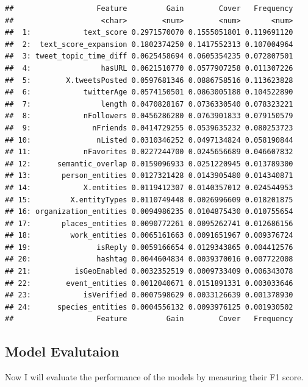 \documentclass[
]{article}
\begin{document}
\begin{verbatim}
##                   Feature         Gain        Cover   Frequency
##                    <char>        <num>        <num>       <num>
##  1:            text_score 0.2971570070 0.1555051801 0.119691120
##  2:  text_score_expansion 0.1802374250 0.1417552313 0.107004964
##  3: tweet_topic_time_diff 0.0625458694 0.0605354235 0.072807501
##  4:                hasURL 0.0621510770 0.0577907258 0.011307226
##  5:        X.tweetsPosted 0.0597681346 0.0886758516 0.113623828
##  6:            twitterAge 0.0574150501 0.0863005188 0.104522890
##  7:                length 0.0470828167 0.0736330540 0.078323221
##  8:            nFollowers 0.0456286280 0.0763901833 0.079150579
##  9:              nFriends 0.0414729255 0.0539635232 0.080253723
## 10:               nListed 0.0310346252 0.0497134824 0.058190844
## 11:            nFavorites 0.0227244700 0.0245656689 0.046607832
## 12:      semantic_overlap 0.0159096933 0.0251220945 0.013789300
## 13:       person_entities 0.0127321428 0.0143905480 0.014340871
## 14:            X.entities 0.0119412307 0.0140357012 0.024544953
## 15:         X.entityTypes 0.0110749448 0.0026996609 0.018201875
## 16: organization_entities 0.0094986235 0.0104875430 0.010755654
## 17:       places_entities 0.0090772261 0.0095262741 0.012686156
## 18:         work_entities 0.0065161663 0.0091651967 0.009376724
## 19:               isReply 0.0059166654 0.0129343865 0.004412576
## 20:               hashtag 0.0044604834 0.0039370016 0.007722008
## 21:          isGeoEnabled 0.0032352519 0.0009733409 0.006343078
## 22:        event_entities 0.0012040671 0.0151891331 0.003033646
## 23:            isVerified 0.0007598629 0.0033126639 0.001378930
## 24:      species_entities 0.0004556132 0.0093976125 0.001930502
##                   Feature         Gain        Cover   Frequency
\end{verbatim}

\subsection{Model Evalutaion}\label{model-evalutaion}

Now I will evaluate the performance of the models by measuring their F1
score.
\end{document}
